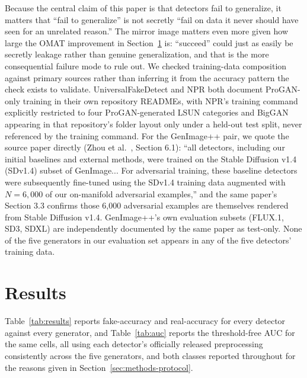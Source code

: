\documentclass[3p,times,procedia]{elsarticle}
\begin{document}
Because the central claim of this paper is that detectors fail to
generalize, it matters that ``fail to generalize'' is not secretly ``fail
on data it never should have seen for an unrelated reason.'' The mirror
image matters even more given how large the OMAT improvement in
Section~\ref{sec:results} is: ``succeed'' could just as easily be secretly
leakage rather than genuine generalization, and that is the more
consequential failure mode to rule out. We
checked training-data composition against primary sources rather than
inferring it from the accuracy pattern the check exists to validate.
UniversalFakeDetect and NPR both document ProGAN-only training in their own
repository READMEs, with NPR's training command explicitly restricted to
four ProGAN-generated LSUN categories and BigGAN appearing in that
repository's folder layout only under a held-out test split, never
referenced by the training command. For the GenImage++ pair, we quote the
source paper directly (Zhou et al.~\cite{zhou2025omat}, Section 6.1):
``all detectors, including our initial baselines and external methods,
were trained on the Stable Diffusion v1.4 (SDv1.4) subset of GenImage...
For adversarial training, these baseline detectors were subsequently
fine-tuned using the SDv1.4 training data augmented with $N=6{,}000$ of our
on-manifold adversarial examples,'' and the same paper's Section 3.3
confirms those 6{,}000 adversarial examples are themselves rendered from
Stable Diffusion v1.4. GenImage++'s own evaluation subsets (FLUX.1, SD3,
SDXL) are independently documented by the same paper as test-only.
None of the five generators in our evaluation set appears in any of the
five detectors' training data.

\section{Results}
\label{sec:results}

Table~\ref{tab:results} reports fake-accuracy and real-accuracy for every
detector against every generator, and Table~\ref{tab:auc} reports the
threshold-free AUC for the same cells, all using each detector's officially
released preprocessing consistently across the five generators, and both
classes reported throughout for the reasons given in
Section~\ref{sec:methods-protocol}.
\end{document}
